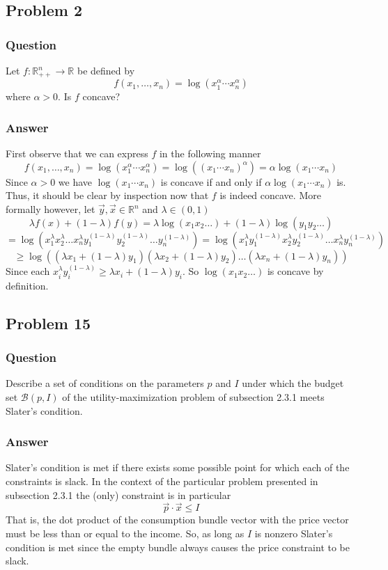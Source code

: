\documentclass[12pt]{article}
\begin{document}
\subsection{Problem 2}
\subsubsection{Question}
Let $f: \mathbb{R}_{++}^n \to \mathbb{R}$ be defined by
\[ f(x_1,\dots , x_n) = \log(x_1^\alpha \cdots x_n^\alpha)\]
where $\alpha>0$. Is $f$ concave?
\subsubsection{Answer}
First observe that we can express $f$ in the following manner
\[ f(x_1,\dots , x_n) = \log(x_1^\alpha \cdots x_n^\alpha) = \log((x_1 \cdots x_n)^\alpha) =\alpha \log(x_1 \cdots x_n)\]
Since $\alpha>0$ we have $ \log(x_1 \cdots x_n)$ is concave if and only if  $\alpha \log(x_1 \cdots x_n)$ is. Thus, it should be clear by inspection now that $f$ is indeed concave. More formally however, let $\vec{y}, \vec{x}\in\mathbb{R}^n$ and $\lambda \in (0,1)$
\[\lambda f(x) + (1-\lambda)f(y) = \lambda \log(x_1 x_2 \dots) + (1-\lambda ) \log(y_1 y_2 \dots)\]
\[=  \log(x_1^ \lambda x_2^ \lambda \dots x_n^\lambda y_1^{(1-\lambda )} y_2^{(1-\lambda )}\dots y_n^{(1-\lambda)})=  \log(x_1^ \lambda  y_1^{(1-\lambda )}  x_2^ \lambda y_2^{(1-\lambda )} \dots x_n^\lambda y_n^{(1-\lambda)}) \]
\[\geq \log((\lambda x_1 + (1-\lambda)y_1)(\lambda x_2 + (1-\lambda)y_2)\dots(\lambda x_n + (1-\lambda)y_n)) \]
Since each $x_i^\lambda y_i^{(1-\lambda)}\geq \lambda x_i + (1-\lambda) y_i$. So $\log(x_1 x_2 \dots)$ is concave by definition.

\subsection{Problem 15}
\subsubsection{Question}
Describe a set of conditions on the parameters $p$ and $I$ under which the budget set $\mathcal{B}(p,I)$ of the utility-maximization problem of subsection 2.3.1 meets Slater's condition.
\subsubsection{Answer}
Slater's condition is met if there exists some possible point for which each of the constraints is slack. In the context of the particular problem presented in subsection 2.3.1 the (only) constraint is in particular
\[\vec{p}\cdot \vec{x} \leq I\]
That is, the dot product of the consumption bundle vector with the price vector must be less than or equal to the income. So, as long as $I$ is nonzero Slater's condition is met since the empty bundle always causes the price constraint to be slack. 
\end{document}
